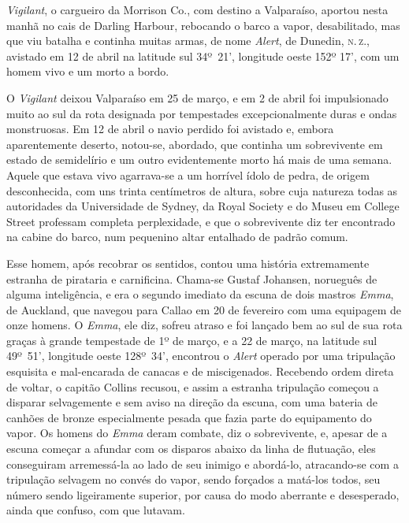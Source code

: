 \emph{Vigilant}, o cargueiro da Morrison Co., com destino a Valparaíso,
aportou nesta manhã no cais de Darling Harbour, rebocando o barco a
vapor, desabilitado, mas que viu batalha e continha muitas armas, de
nome \emph{Alert}, de Dunedin, \textsc{n.\,z.}, avistado em 12 de abril na latitude
sul 34º~21', longitude oeste 152º 17', com um homem vivo e um morto a bordo.

O \emph{Vigilant} deixou Valparaíso em 25 de março, e em 2 de abril foi
impulsionado muito ao sul da rota designada por tempestades
excepcionalmente duras e ondas monstruosas. Em 12 de abril o navio
perdido foi avistado e, embora aparentemente deserto, notou-se,
abordado, que continha um sobrevivente em estado de semidelírio e um
outro evidentemente morto há mais de uma semana. Aquele que estava vivo
agarrava-se a um horrível ídolo de pedra, de origem desconhecida, com
uns trinta centímetros de altura, sobre cuja natureza todas as
autoridades da Universidade de Sydney, da Royal Society e do Museu em
College Street professam completa perplexidade, e que o sobrevivente diz
ter encontrado na cabine do barco, num pequenino altar entalhado de
padrão comum.

Esse homem, após recobrar os sentidos, contou uma história extremamente
estranha de pirataria e carnificina. Chama-se Gustaf Johansen, norueguês
de alguma inteligência, e era o segundo imediato da escuna de dois
mastros \emph{Emma}, de Auckland, que navegou para Callao em 20 de
fevereiro com uma equipagem de onze homens. O \emph{Emma}, ele diz,
sofreu atraso e foi lançado bem ao sul de sua rota graças à grande
tempestade de 1º de março, e a 22 de março, na
latitude sul 49º~51', longitude
oeste 128º~34', encontrou o \emph{Alert} operado por uma tripulação
esquisita e mal-encarada de canacas e de miscigenados. Recebendo ordem
direta de voltar, o capitão Collins recusou, e assim a estranha
tripulação começou a disparar selvagemente e sem aviso na direção da
escuna, com uma bateria de canhões de bronze especialmente pesada que
fazia parte do equipamento do vapor. Os homens do \emph{Emma} deram
combate, diz o sobrevivente, e, apesar de a escuna começar a afundar com
os disparos abaixo da linha de flutuação, eles conseguiram arremessá-la
ao lado de seu inimigo e abordá-lo, atracando-se com a tripulação
selvagem no convés do vapor, sendo forçados a matá-los todos, seu número
sendo ligeiramente superior, por causa do modo aberrante e desesperado,
ainda que confuso, com que lutavam.

